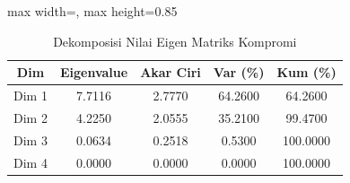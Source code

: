 \begin{table}[H]
\centering
\caption{Dekomposisi Nilai Eigen Matriks Kompromi} \label{tab:eigen}
\begin{adjustbox}{max width=\textwidth, max height=0.85\textheight}
\begin{tabular}{|c|c|c|c|c|}
\hline
\textbf{Dim} & \textbf{Eigenvalue} & \textbf{Akar Ciri} & \textbf{Var (\%)} & \textbf{Kum (\%)} \\
\hline
Dim 1 & 7.7116 & 2.7770 & 64.2600 & 64.2600 \\
Dim 2 & 4.2250 & 2.0555 & 35.2100 & 99.4700 \\
Dim 3 & 0.0634 & 0.2518 & 0.5300 & 100.0000 \\
Dim 4 & 0.0000 & 0.0000 & 0.0000 & 100.0000 \\
\hline
\end{tabular}
\end{adjustbox}
\end{table}